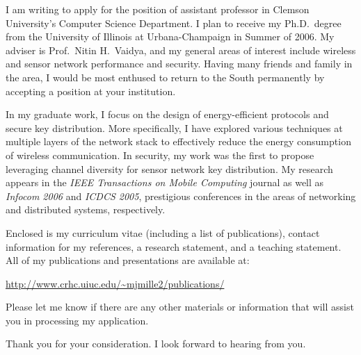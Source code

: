 \documentclass[10pt,stdletter,dateno]{newlfm}
\begin{document}
\begin{newlfm}

I am writing to apply for the position of assistant
professor in Clemson University's Computer Science Department.  I plan to receive my
Ph.D.\ degree from the University of Illinois at
Urbana-Champaign in Summer of 2006.  My adviser is
Prof.\ Nitin H.\ Vaidya, and my general areas of interest
include wireless and sensor network performance and security.
 Having many friends and family in the area, I would be
most enthused to return to the South permanently by accepting
a position at your institution.

In my graduate work, I focus on the design of
energy-efficient protocols and secure key distribution.
More specifically, I have explored various techniques at
multiple layers of the network stack to effectively reduce
the energy consumption of wireless communication.  In security,
my work was the first to propose leveraging channel diversity
for sensor network key distribution.  My research appears in 
the \textit{IEEE Transactions on Mobile Computing} journal as
well as \textit{Infocom 2006} and \textit{ICDCS 2005},
prestigious conferences in the areas of networking and distributed
systems, respectively.

Enclosed is my curriculum vitae (including a list of
publications), contact information for my references, a research
statement, and a teaching statement.  All of my publications and
presentations are available at:

\url{http://www.crhc.uiuc.edu/~mjmille2/publications/}

Please let me know if there are any other materials
or information that will assist you in processing my application.

Thank you for your consideration.  I look forward to
hearing from you.

\end{newlfm}
\end{document}
